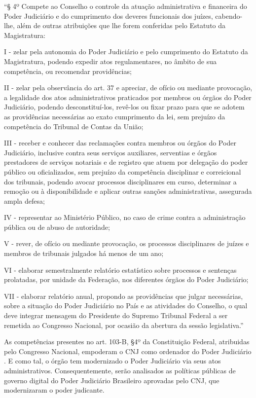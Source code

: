 \noindent
\begin{flushleft}
	\setlength{\leftskip}{4cm}
	\small
	“§ 4º Compete ao Conselho o controle da atuação administrativa e financeira do Poder Judiciário e do cumprimento dos deveres funcionais dos juízes, cabendo-lhe, além de outras atribuições que lhe forem conferidas pelo Estatuto da Magistratura:
	
	I - zelar pela autonomia do Poder Judiciário e pelo cumprimento do Estatuto da Magistratura, podendo expedir atos regulamentares, no âmbito de sua competência, ou recomendar providências;
	
	II - zelar pela observância do art. 37 e apreciar, de ofício ou mediante provocação, a legalidade dos atos administrativos praticados por membros ou órgãos do Poder Judiciário, podendo desconstituí-los, revê-los ou fixar prazo para que se adotem as providências necessárias ao exato cumprimento da lei, sem prejuízo da competência do Tribunal de Contas da União;
	
	III - receber e conhecer das reclamações contra membros ou órgãos do Poder Judiciário, inclusive contra seus serviços auxiliares, serventias e órgãos prestadores de serviços notariais e de registro que atuem por delegação do poder público ou oficializados, sem prejuízo da competência disciplinar e correicional dos tribunais, podendo avocar processos disciplinares em curso, determinar a remoção ou à disponibilidade e aplicar outras sanções administrativas, assegurada ampla defesa;
	
	IV - representar ao Ministério Público, no caso de crime contra a administração pública ou de abuso de autoridade;
	
	V - rever, de ofício ou mediante provocação, os processos disciplinares de juízes e membros de tribunais julgados há menos de um ano;
	
	VI - elaborar semestralmente relatório estatístico sobre processos e sentenças prolatadas, por unidade da Federação, nos diferentes órgãos do Poder Judiciário;
	
	VII - elaborar relatório anual, propondo as providências que julgar necessárias, sobre a situação do Poder Judiciário no País e as atividades do Conselho, o qual deve integrar mensagem do Presidente do Supremo Tribunal Federal a ser remetida ao Congresso Nacional, por ocasião da abertura da sessão legislativa.”
\end{flushleft}         

As competências presentes no art. 103-B, §4º da Constituição Federal, atribuidas pelo Congresso Nacional, empoderam o CNJ como ordenador do Poder Judiciário . E como tal, o órgão tem modernizado o Poder Judiciário via seus atos administrativos. Consequentemente, serão analisados as políticas públicas de governo digital do Poder Judiciário Brasileiro aprovadas pelo CNJ, que modernizaram o poder judicante.

